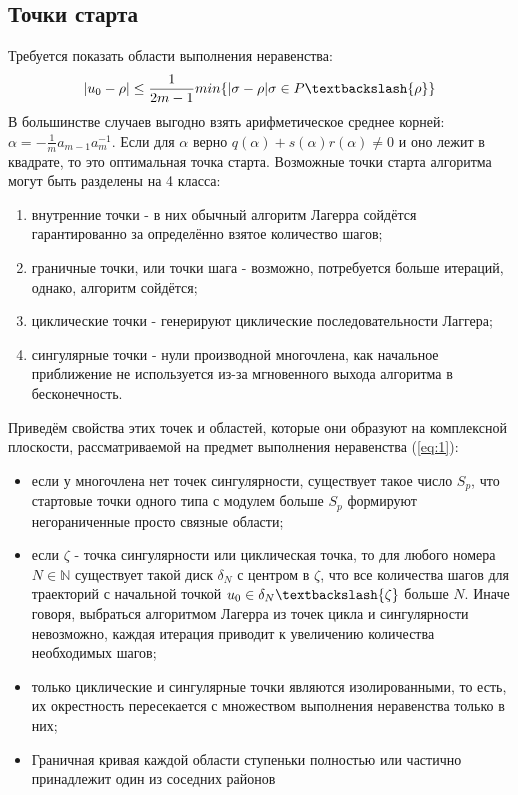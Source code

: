 \documentclass[a4paper,12pt]{article}
\begin{document}
\subsection{Точки старта}
Требуется показать области выполнения неравенства:
\begin{equation} \label{eq:1}
    |u_0-\rho| \leq \frac{1}{2m-1}min \{ |\sigma - \rho|\sigma \in P \textbackslash \{ \rho \} \}
\end{equation}
В большинстве случаев выгодно взять арифметическое среднее корней: \\
$\alpha=-\frac{1}{m}a_{m-1}a^{-1}_m$. Если для $\alpha$ верно $q(\alpha)+s(\alpha)r(\alpha) \neq 0$ и оно лежит в квадрате, то это оптимальная точка старта.
Возможные точки старта алгоритма могут быть разделены на 4 класса:
\begin{enumerate}
    \item внутренние точки - в них обычный алгоритм Лагерра сойдётся гарантированно за определённо взятое количество шагов;
    \item граничные точки, или точки шага - возможно, потребуется больше итераций, однако, алгоритм сойдётся;
    \item циклические точки - генерируют циклические последовательности Лаггера;
    \item сингулярные точки - нули производной многочлена, как начальное приближение не используется из-за мгновенного выхода алгоритма в бесконечность.
\end{enumerate}
Приведём свойства этих точек и областей, которые они образуют на комплексной плоскости, рассматриваемой на предмет выполнения неравенства (\ref{eq:1}): \\
\begin{itemize}
    \item если у многочлена нет точек сингулярности, существует такое число $S_p$, что стартовые точки одного типа с модулем больше $S_p$ формируют негораниченные просто связные области;
    \item если $\zeta$ - точка сингулярности или циклическая точка, то для любого номера $N \in \mathbb{N}$ существует такой диск $\delta_N$ с центром в $\zeta$, что все количества шагов для траекторий с начальной точкой $u_0 \in \delta_N \textbackslash {\zeta}$ больше $N$. Иначе говоря, выбраться алгоритмом Лагерра из точек цикла и сингулярности невозможно, каждая итерация приводит к увеличению количества необходимых шагов;
    \item только циклические и сингулярные точки являются изолированными, то есть, их окрестность пересекается с множеством выполнения неравенства только в них;
    \item Граничная кривая каждой области ступеньки полностью или частично принадлежит один из соседних районов
\end{itemize}
\end{document}
